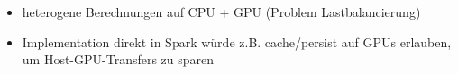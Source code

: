 \begin{frame}
\begin{itemize}

       \item heterogene Berechnungen auf CPU + GPU (Problem Lastbalancierung) %
       \item Implementation direkt in Spark würde z.B. cache/persist auf GPUs erlauben, um Host-GPU-Transfers zu sparen
    \end{itemize}
\end{frame}



